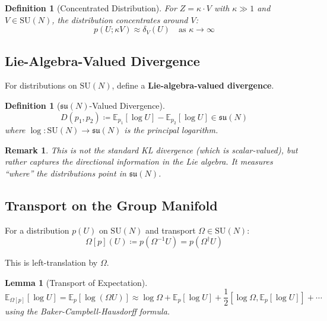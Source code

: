 \documentclass[11pt,a4paper]{article}
\newtheorem{lemma}[theorem]{Lemma}
\newtheorem{definition}[theorem]{Definition}
\newtheorem{remark}[theorem]{Remark}
\newcommand{\suN}{\mathfrak{su}(N)}
\newcommand{\SUN}{\mathrm{SU}(N)}
\newcommand{\E}{\mathbb{E}}
\begin{document}
\begin{definition}[Concentrated Distribution]
For $Z = \kappa \cdot V$ with $\kappa \gg 1$ and $V \in \SUN$, the distribution concentrates around $V$:
\begin{equation}
    p(U; \kappa V) \approx \delta_V(U) \quad \text{as } \kappa \to \infty
\end{equation}
\end{definition}

\subsection{Lie-Algebra-Valued Divergence}

For distributions on $\SUN$, define a \textbf{Lie-algebra-valued divergence}.

\begin{definition}[$\suN$-Valued Divergence]
\begin{equation}
    D(p_1, p_2) \coloneqq \E_{p_1}[\log U] - \E_{p_2}[\log U] \in \suN
\end{equation}
where $\log: \SUN \to \suN$ is the principal logarithm.
\end{definition}

\begin{remark}
This is not the standard KL divergence (which is scalar-valued), but rather captures the \emph{directional} information in the Lie algebra. It measures ``where'' the distributions point in $\suN$.
\end{remark}

\subsection{Transport on the Group Manifold}

For a distribution $p(U)$ on $\SUN$ and transport $\Omega \in \SUN$:
\begin{equation}
    \Omega[p](U) \coloneqq p(\Omega^{-1} U) = p(\Omega^\dagger U)
\end{equation}

This is left-translation by $\Omega$.

\begin{lemma}[Transport of Expectation]
\begin{equation}
    \E_{\Omega[p]}[\log U] = \E_p[\log(\Omega U)] \approx \log\Omega + \E_p[\log U] + \frac{1}{2}[\log\Omega, \E_p[\log U]] + \cdots
\end{equation}
using the Baker-Campbell-Hausdorff formula.
\end{lemma}
\end{document}

